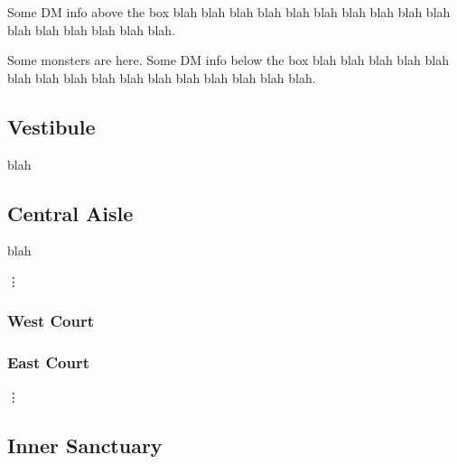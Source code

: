 \documentclass[a4paper,serif]{module}
\begin{document}
Some DM info above the box blah blah blah blah blah blah blah blah blah blah blah blah blah blah blah blah.



Some monsters are here.
Some DM info below the box blah blah blah blah blah blah blah blah blah blah blah blah blah blah blah blah.

\subsection{Vestibule}                                                          %


blah

\subsection{Central Aisle}                                                      %


blah

\vdots                                                                          %

\setcounter{subsection}{7}
\subsubsection{West Court}                                                      %
\label{west_court}

\subsubsection{East Court}                                                      %

\vdots
\setcounter{subsection}{13}                                                     %

\subsection{Inner Sanctuary}                                                    %
\label{inner_sanctuary}
\end{document}
